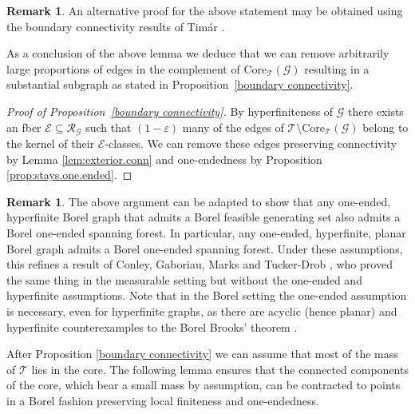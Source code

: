 \documentclass[letterpaper,11pt,reqno]{amsart}
\theoremstyle{bfnote}
\theoremstyle{definition}
\newtheorem{remark}[theorem]{Remark}
\newcommand{\0}{\varnothing}
\numberwithin{equation}{section}
\begin{document}
\begin{remark}
    An alternative proof for the above statement may be obtained using the boundary connectivity results of Tim\'ar \cite{TimarBC}.
\end{remark}

As a conclusion of the above lemma we deduce that we can remove arbitrarily large proportions of edges in the complement of $\mathrm{Core}_\mathcal{T}(\mathcal{G})$ resulting in a substantial subgraph as stated in Proposition~\ref{boundary connectivity}. 

\begin{proof}[Proof of Proposition~\ref{boundary connectivity}]
By hyperfiniteness of $\mathcal{G}$ there exists an fber $\mathcal E \subseteq \mathcal R_{\mathcal G}$ such that $(1- \varepsilon)$ many of the edges of $\mathcal{T}\setminus \mathrm{Core}_\mathcal{T} (\mathcal{G})$ belong to the kernel of their $\mathcal E$-classes. We can remove these edges preserving connectivity by Lemma \ref{lem:exterior.conn} and one-endedness by Proposition \ref{prop:stays.one.ended}.
\end{proof}

\begin{remark}
    The above argument can be adapted to show that any one-ended, hyperfinite Borel graph that admits a Borel feasible generating set also admits a Borel one-ended spanning forest.  In particular, any one-ended, hyperfinite, planar Borel graph admits a Borel one-ended spanning forest.  Under these assumptions, this refines a result of Conley, Gaboriau, Marks and Tucker-Drob \cite[Theorem 10]{cgmtd}, who proved the same thing in the measurable setting but without the one-ended and hyperfinite assumptions. Note that in the Borel setting the one-ended assumption is necessary, even for hyperfinite graphs, as there are acyclic (hence planar) and hyperfinite counterexamples to the Borel Brooks' theorem \cite{conley2020borel}.
\end{remark}

After Proposition \ref{boundary connectivity} we can assume that most of the mass of $\mathcal T$ lies in the core. The following lemma ensures that the connected components of the core, which bear a small mass by assumption, can be contracted to points in a Borel fashion preserving local finiteness and one-endedness.
\end{document}
